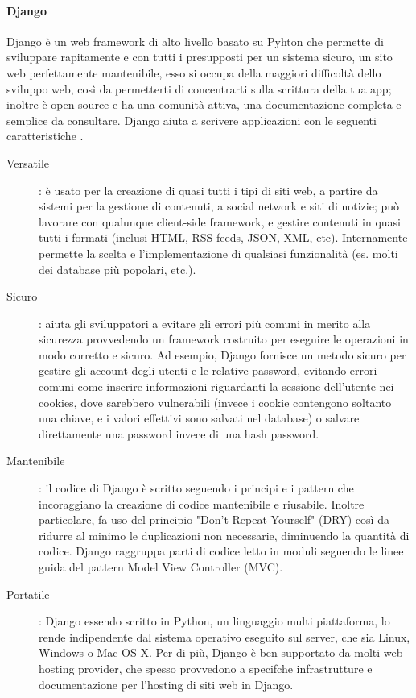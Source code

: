 \paragraph{Django}
Django è un web framework di alto livello basato su Pyhton che permette di sviluppare rapitamente e con tutti i presupposti per un sistema sicuro, un sito web
perfettamente mantenibile, esso si occupa della maggiori difficoltà dello sviluppo web, così da permetterti di concentrarti sulla scrittura della tua app; inoltre 
è open-source e ha una comunità attiva, una documentazione completa e semplice da consultare.\hfill\break
Django aiuta a scrivere applicazioni con le seguenti caratteristiche \cite{django-documentation}.
\begin{description}
    \item[Versatile]: è usato per la creazione di quasi tutti i tipi di siti web, a partire da sistemi per la gestione di contenuti,
    a social network e siti di notizie; può lavorare con qualunque client-side framework, e gestire contenuti in quasi tutti i formati (inclusi HTML, 
    RSS feeds, JSON, XML, etc). Internamente permette la scelta e l'implementazione di qualsiasi funzionalità (es. molti dei database più popolari, etc.).
    \item[Sicuro]: aiuta gli sviluppatori a evitare gli errori più comuni in merito alla sicurezza provvedendo un framework costruito per eseguire 
    le operazioni in modo corretto e sicuro. Ad esempio, Django fornisce un metodo sicuro per gestire gli account degli utenti e le relative 
    password, evitando errori comuni come inserire informazioni riguardanti la sessione dell'utente nei cookies, dove sarebbero vulnerabili (invece i cookie 
    contengono soltanto una chiave, e i valori effettivi sono salvati nel database) o salvare direttamente una password invece di una hash password.
    \item[Mantenibile]: il codice di Django è scritto seguendo i principi e i pattern che incoraggiano la creazione di codice mantenibile e riusabile. Inoltre 
    particolare, fa uso del principio "Don't Repeat Yourself" (DRY) così da ridurre al minimo le duplicazioni non necessarie, diminuendo la quantità di codice.
    Django raggruppa parti di codice letto in moduli seguendo le linee guida del pattern Model View Controller (MVC).
    \item[Portatile]: Django essendo scritto in Python, un linguaggio multi piattaforma, lo rende indipendente dal sistema operativo eseguito sul server, che 
    sia Linux, Windows o Mac OS X. Per di più, Django è ben supportato da molti web hosting provider, che spesso provvedono a specifche infrastrutture
    e documentazione per l'hosting di siti web in Django.
\end{description}
